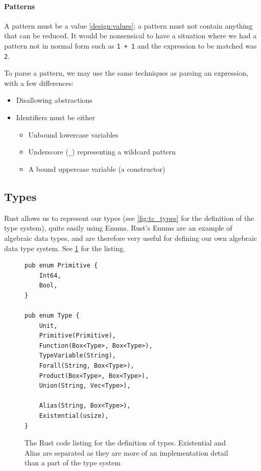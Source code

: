 \paragraph{Patterns}
\label{impl:parsing_patterns}
A pattern must be a value \ref{design:values}; a pattern must not contain anything that can be reduced. It would be nonsensical to have a situation where we had a pattern not in normal form such as \verb|1 + 1| and the expression to be matched was \verb|2|. 

To parse a pattern, we may use the same techniques as parsing an expression, with a few differences:
\begin{itemize}
    \item Disallowing abstractions
    \item Identifiers must be either
    \begin{itemize}
        \item Unbound lowercase variables
        \item Underscore (\verb|_|) representing a wildcard pattern
        \item A bound uppercase variable (a constructor)
    \end{itemize}
\end{itemize}

\subsection{Types}

Rust allows us to represent our types (see \ref{fig:tc_types} for the definition of the type system), quite easily using Enums. Rust's Enums are an example of algebraic data types, and are therefore very useful for defining our own algebraic data type system. See \ref{fig:type_lst} for the listing. 

\begin{figure}[ht]
    \begin{lstlisting}[language=Rust_boxed]
pub enum Primitive {
    Int64,
    Bool,
}

pub enum Type {
    Unit,
    Primitive(Primitive),
    Function(Box<Type>, Box<Type>),
    TypeVariable(String),
    Forall(String, Box<Type>),
    Product(Box<Type>, Box<Type>),
    Union(String, Vec<Type>),

    Alias(String, Box<Type>),
    Existential(usize),
}
\end{lstlisting}
    \caption{The Rust code listing for the definition of types. Existential and Alias are separated as they are more of an implementation detail than a part of the type system}
    \label{fig:type_lst}
\end{figure}

